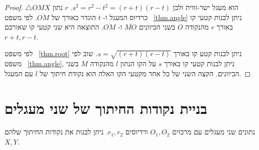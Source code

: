 \begin{proof}
%
$\triangle OMX$
הוא מעגל ישר-זווית ולכן
$s^2=r^2-t^2=(r+t)(r-t)$.
$r$
נתון כרדיוס המעגל ו-%
$t$
הוגדר כאורך של
$\overline{OM}$.
לפי משפט~%
\ref{thm.angle}
ניתן לבנות קטעי קו באורך
$r$
מהנקודה 
$O$
בשני הכיוונים
$\overline{MO}$
ו-%
$\overline{OM}$.
התוצאה היא שני קטעי קו שאורכם
$r+t,r-t$.

לפי משפט~%
\ref{thm.root}
ניתן לבנות קטע קו באורך
$s=\sqrt{(r+t)(r-t)}$.
שוב לפי משפט~%
\ref{thm.angle},
ניתן לבנות קטעי קו באורך 
$s$
על הקו הנתון
$l$
מהנקודה
$M$
בשני הכיוונים. הקצה השני של כל אחד מקטעי הקו האלה הוא נקודת חיתוך של 
$l$
עם המעגל.
\end{proof}


\section{בניית נקודות החיתוך של שני מעגלים}\label{s.circle-circle}

\begin{theorem}\label{thm.two-circles}
נתונים שני מעגלים עם מרכזים
$O_1,O_2$
ורדיוסים
$r_1,r_2$.
ניתן לבנות את נקודות החיתוך שלהם
$X,Y$.
\end{theorem}

